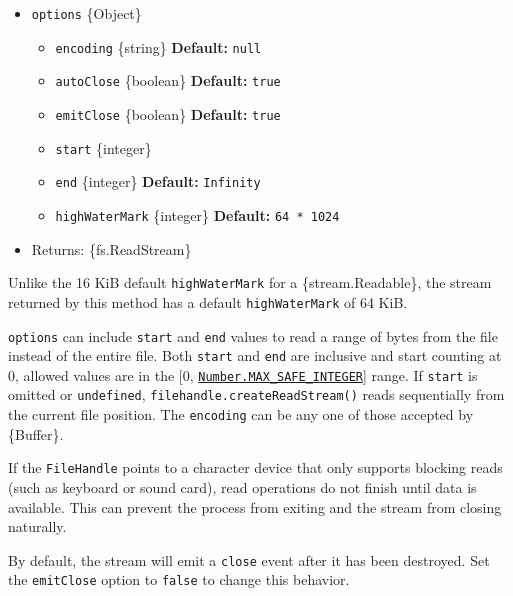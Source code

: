 \begin{itemize}
\tightlist
\item
  \texttt{options} \{Object\}

  \begin{itemize}
  \tightlist
  \item
    \texttt{encoding} \{string\} \textbf{Default:} \texttt{null}
  \item
    \texttt{autoClose} \{boolean\} \textbf{Default:} \texttt{true}
  \item
    \texttt{emitClose} \{boolean\} \textbf{Default:} \texttt{true}
  \item
    \texttt{start} \{integer\}
  \item
    \texttt{end} \{integer\} \textbf{Default:} \texttt{Infinity}
  \item
    \texttt{highWaterMark} \{integer\} \textbf{Default:}
    \texttt{64\ *\ 1024}
  \end{itemize}
\item
  Returns: \{fs.ReadStream\}
\end{itemize}

Unlike the 16 KiB default \texttt{highWaterMark} for a
\{stream.Readable\}, the stream returned by this method has a default
\texttt{highWaterMark} of 64 KiB.

\texttt{options} can include \texttt{start} and \texttt{end} values to
read a range of bytes from the file instead of the entire file. Both
\texttt{start} and \texttt{end} are inclusive and start counting at 0,
allowed values are in the {[}0,
\href{https://developer.mozilla.org/en-US/docs/Web/JavaScript/Reference/Global_Objects/Number/MAX_SAFE_INTEGER}{\texttt{Number.MAX\_SAFE\_INTEGER}}{]}
range. If \texttt{start} is omitted or \texttt{undefined},
\texttt{filehandle.createReadStream()} reads sequentially from the
current file position. The \texttt{encoding} can be any one of those
accepted by \{Buffer\}.

If the \texttt{FileHandle} points to a character device that only
supports blocking reads (such as keyboard or sound card), read
operations do not finish until data is available. This can prevent the
process from exiting and the stream from closing naturally.

By default, the stream will emit a
\texttt{\textquotesingle{}close\textquotesingle{}} event after it has
been destroyed. Set the \texttt{emitClose} option to \texttt{false} to
change this behavior.

